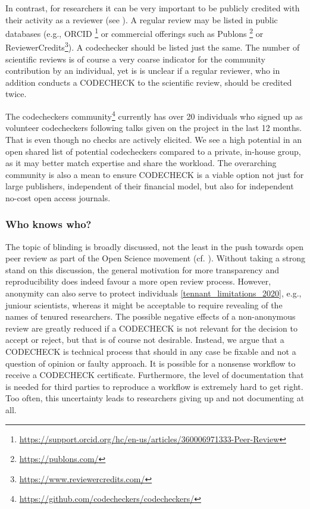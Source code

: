 \documentclass[12pt]{article}
\begin{document}
In contrast, for researchers it can be very important to be publicly credited
with their activity as a reviewer (see ). A regular
review may be listed in public databases (e.g., ORCID
\footnote{\href{https://support.orcid.org/hc/en-us/articles/360006971333-Peer-Review}{https://support.orcid.org/hc/en-us/articles/360006971333-Peer-Review}} or commercial offerings such as Publons
\footnote{\href{https://publons.com/}{https://publons.com/}} or 
ReviewerCredits\footnote{\href{https://www.reviewercredits.com/}{https://www.reviewercredits.com/}}).
A codechecker should be listed just the same. The number of scientific reviews
is of course a very coarse indicator for the community contribution by an 
individual, yet is is unclear if a regular reviewer, who in addition
conducts a CODECHECK to the scientific review, should be credited twice.

The codecheckers community\footnote{\href{https://github.com/codecheckers/codecheckers/}{https://github.com/codecheckers/codecheckers/}}
currently has over 20 individuals who signed up as volunteer codecheckers
following talks given on the project in the last 12 months.
That is even though no checks are actively elicited.
We see a high potential in an open shared list of potential codecheckers 
compared to a private, in-house group, as it may better match expertise
and share the workload.
The overarching community is also a mean to ensure CODECHECK is a viable
option not just for large publishers, independent of their financial model,
but also for independent no-cost open access journals.

\subsubsection*{Who knows who?}\label{who-knows-who}

The topic of blinding is broadly discussed, not the least in the push towards
open peer review as part of the Open Science movement 
(cf. \cite{ross-hellauer_guidelines_2019}).
Without taking a strong stand on this discussion, the general motivation 
for more  transparency and reproducibility does indeed favour a more open 
review process.
However, anonymity can also serve to protect individuals 
\ref{tennant_limitations_2020}, e.g.,  juniour scientists, whereas it might 
be acceptable to require revealing of the names of tenured researchers.
The possible negative effects of a non-anonymous review are greatly reduced
if a CODECHECK is not relevant for the decision to accept or reject, but that
is of course not desirable. Instead, we argue that a CODECHECK is technical
process that should in any case be fixable and not a question of opinion or
faulty approach. It is possible for a nonsense workflow to receive a 
CODECHECK certificate.
Furthermore, the level of documentation that is needed for third parties
to reproduce a workflow is extremely hard to get right. Too often, this 
uncertainty leads to researchers giving up and not documenting at all.
\end{document}
